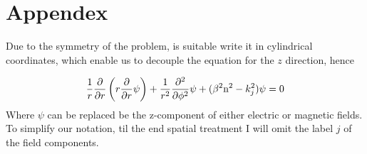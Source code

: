 \chapter{Appendex}
\label{app:Comsol_Solution}

Due to the symmetry of the problem, is suitable write it in cylindrical coordinates, which enable us to decouple the equation for the $z$ direction, hence

\begin{equation}
    \frac{1}{r}\dfrac{\partial }{\partial r}\left(r \dfrac{\partial  }{\partial r}\psi\right)+\frac{1}{r^2} \dfrac{\partial ^2}{\partial \phi^2}\psi + (\beta^2\text{n}^2-k_j^2)\psi = 0
\end{equation}
Where $\psi$ can be replaced be the z-component of either electric or magnetic fields. To simplify our notation, til the end spatial treatment I will omit the label $j$ of the field components. 
